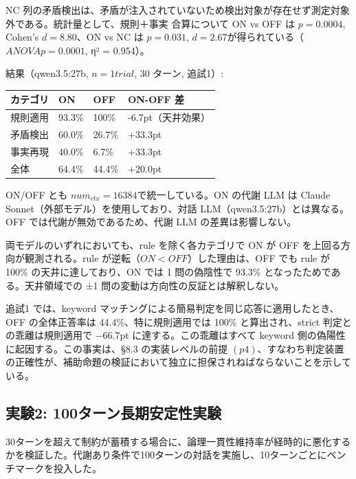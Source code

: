 \documentclass[12pt,a4paper]{article}
\begin{document}
NC 列の矛盾検出は、矛盾が注入されていないため検出対象が存在せず測定対象外である。統計量として、規則＋事実 合算について ON vs OFF は \(p = 0.0004\), Cohen's \(d = 8.80\)、ON vs NC は \(p = 0.031\), \(d = 2.67\)が得られている（\(ANOVA p = 0.0001\), η² = 0.954）。

結果（qwen3.5:27b, \(n=1 trial\), 30 ターン, 追試1）:

{\def\LTcaptype{table} %
\begin{longtable}[]{@{}llll@{}}
\toprule\noalign{}
カテゴリ & ON & OFF & ON-OFF 差 \\
\midrule\noalign{}
\endhead
\bottomrule\noalign{}
\endlastfoot
規則適用 & 93.3\% & 100\% & -6.7pt（天井効果） \\
矛盾検出 & 60.0\% & 26.7\% & +33.3pt \\
事実再現 & 40.0\% & 6.7\% & +33.3pt \\
全体 & 64.4\% & 44.4\% & +20.0pt \\
\end{longtable}
}

ON/OFF とも \(num_{ctx}=16384\)で統一している。ON の代謝 LLM は Claude Sonnet（外部モデル）を使用しており、対話 LLM（qwen3.5:27b）とは異なる。OFF では代謝が無効であるため、代謝 LLM の差異は影響しない。

両モデルのいずれにおいても、rule を除く各カテゴリで ON が OFF を上回る方向が観測される。rule が逆転（\(ON < OFF\)）した理由は、OFF でも rule が 100\% の天井に達しており、ON では 1 問の偽陰性で 93.3\% となったためである。天井領域での ±1 問の変動は方向性の反証とは解釈しない。

追試1 では、keyword マッチングによる簡易判定を同じ応答に適用したとき、OFF の全体正答率は 44.4\%、特に規則適用では 100\% と算出され、strict 判定との乖離は規則適用で −66.7pt に達する。この乖離はすべて keyword 側の偽陽性に起因する。この事実は、§8.3 の実装レベルの前提 \((p4)\)、すなわち判定装置の正確性が、補助命題の検証において独立に担保されねばならないことを示している。

\subsection{実験2: 100ターン長期安定性実験}\label{ux5b9fux9a132-100ux30bfux30fcux30f3ux9577ux671fux5b89ux5b9aux6027ux5b9fux9a13}

30ターンを超えて制約が蓄積する場合に、論理一貫性維持率が経時的に悪化するかを検証した。代謝あり条件で100ターンの対話を実施し、10ターンごとにベンチマークを投入した。
\end{document}
